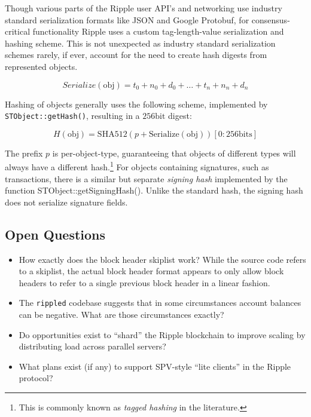 \documentclass{article}
\begin{document}
Though various parts of the Ripple user API's and networking use industry
standard serialization formats like JSON and Google Protobuf, for
consensus-critical functionality Ripple uses a custom tag-length-value
serialization and hashing scheme. This is not unexpected as industry standard
serialization schemes rarely, if ever, account for the need to create hash
digests from represented objects.

\begin{equation}
    \textit{Serialize}(\text{obj}) = t_0+n_0+d_0 + \hdots + t_n+n_n+d_n
\end{equation}

Hashing of objects generally uses the following scheme, implemented by
\texttt{STObject::getHash()}, resulting in a $256\text{bit}$ digest:

\begin{equation}
    H(\text{obj}) = \text{SHA512}(p + \text{Serialize}(\text{obj}))[0:256\text{bits}]
\end{equation}

The prefix $p$ is per-object-type, guaranteeing that objects of different types
will always have a different hash.\footnote{This is commonly known as
\emph{tagged hashing} in the literature.} For objects containing signatures,
such as transactions, there is a similar but separate \emph{signing hash}
implemented by the function STObject::getSigningHash(). Unlike the standard
hash, the signing hash does not serialize signature fields.


\subsection{Open Questions}

\begin{itemize}

    \item How exactly does the block header skiplist work? While the source code
        refers to a skiplist, the actual block header format appears to only
        allow block headers to refer to a single previous block header in a
        linear fashion.

    \item The \texttt{rippled} codebase suggests that in some circumstances account
        balances can be negative. What are those circumstances exactly?

    \item Do opportunities exist to ``shard'' the Ripple blockchain to improve
        scaling by distributing load across parallel servers?

    \item What plans exist (if any) to support SPV-style ``lite clients'' in
        the Ripple protocol?

\end{itemize}
\end{document}
